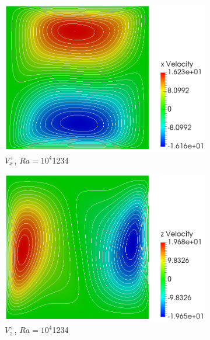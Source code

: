\begin{figure}[!h]
\begin{subfigure}{0.32\textwidth}
  \includegraphics[width=\linewidth]{figs/Ra4_u.png}
  \caption{\(V_x^+\), \(Ra=10^4\)\color{white}1234}
    \vspace*{0.5em}
\end{subfigure}
\begin{subfigure}{0.32\textwidth}
  \centering
  \includegraphics[width=\linewidth]{figs/Ra4_v.png}
  \caption{\(V_z^+\), \(Ra=10^4\)\color{white}1234}
    \vspace*{0.5em}
\end{subfigure}
\begin{subfigure}{0.32\textwidth}
  \centering

\end{subfigure}
\end{figure}
